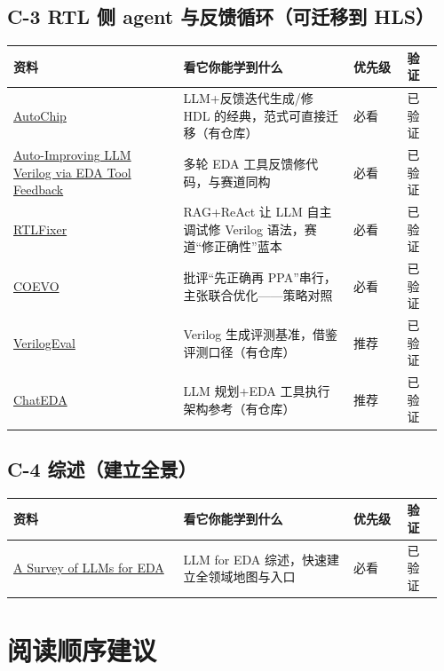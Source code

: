 \documentclass[12pt,a4paper]{ctexbook}
\begin{document}
\subsection*{C-3  RTL 侧 agent 与反馈循环（可迁移到 HLS）}

{\small
\begin{longtable}{@{}L{0.38\linewidth}L{0.38\linewidth}L{0.12\linewidth}L{0.08\linewidth}@{}}
\toprule
\textbf{资料} & \textbf{看它你能学到什么} & \textbf{优先级} & \textbf{验证} \\
\midrule
\endhead
\href{https://arxiv.org/abs/2311.04887}{AutoChip} & LLM+反馈迭代生成/修 HDL 的经典，范式可直接迁移（有仓库） & 必看 & 已验证 \\
\href{https://arxiv.org/abs/2411.11856}{Auto-Improving LLM Verilog via EDA Tool Feedback} & 多轮 EDA 工具反馈修代码，与赛道同构 & 必看 & 已验证 \\
\href{https://arxiv.org/abs/2311.16543}{RTLFixer} & RAG+ReAct 让 LLM 自主调试修 Verilog 语法，赛道“修正确性”蓝本 & 必看 & 已验证 \\
\href{https://arxiv.org/abs/2604.15001}{COEVO} & 批评“先正确再 PPA”串行，主张联合优化——策略对照 & 必看 & 已验证 \\
\href{https://arxiv.org/abs/2309.07544}{VerilogEval} & Verilog 生成评测基准，借鉴评测口径（有仓库） & 推荐 & 已验证 \\
\href{https://arxiv.org/abs/2308.10204}{ChatEDA} & LLM 规划+EDA 工具执行架构参考（有仓库） & 推荐 & 已验证 \\
\bottomrule
\end{longtable}
}

\subsection*{C-4  综述（建立全景）}

{\small
\begin{longtable}{@{}L{0.38\linewidth}L{0.38\linewidth}L{0.12\linewidth}L{0.08\linewidth}@{}}
\toprule
\textbf{资料} & \textbf{看它你能学到什么} & \textbf{优先级} & \textbf{验证} \\
\midrule
\endhead
\href{https://arxiv.org/abs/2501.09655}{A Survey of LLMs for EDA} & LLM for EDA 综述，快速建立全领域地图与入口 & 必看 & 已验证 \\
\bottomrule
\end{longtable}
}

\section{阅读顺序建议}
\end{document}
